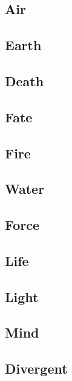 \begin{multicols}{2}

\subsection{Air}


\subsection{Earth}


\subsection{Death}


\subsection{Fate}


\subsection{Fire}


\subsection{Water}


\subsection{Force}


\subsection{Life}


\subsection{Light}


\subsection{Mind}


\subsection{Divergent}


\end{multicols}
